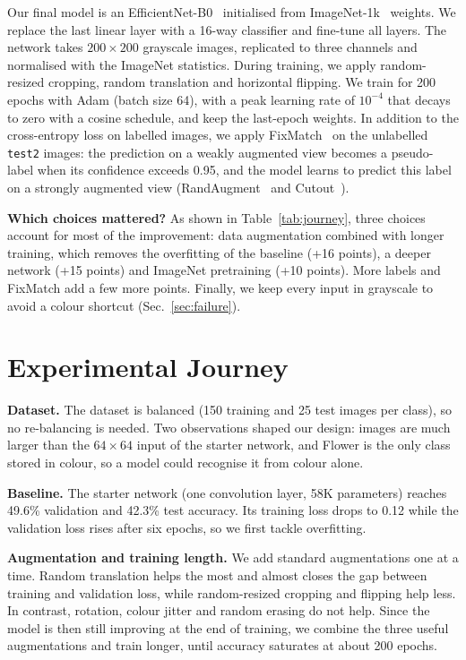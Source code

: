 \documentclass{article}
\begin{document}
Our final model is an EfficientNet-B0~\cite{efficientnet} initialised from ImageNet-1k~\cite{imagenet} weights. We replace the last linear layer with a 16-way classifier and fine-tune all layers. The network takes $200\times200$ grayscale images, replicated to three channels and normalised with the ImageNet statistics. During training, we apply random-resized cropping, random translation and horizontal flipping. We train for 200 epochs with Adam (batch size 64), with a peak learning rate of $10^{-4}$ that decays to zero with a cosine schedule, and keep the last-epoch weights. In addition to the cross-entropy loss on labelled images, we apply FixMatch~\cite{fixmatch} on the unlabelled \texttt{test2} images: the prediction on a weakly augmented view becomes a pseudo-label when its confidence exceeds 0.95, and the model learns to predict this label on a strongly augmented view (RandAugment~\cite{randaugment} and Cutout~\cite{cutout}).

\textbf{Which choices mattered?} As shown in Table~\ref{tab:journey}, three choices account for most of the improvement: data augmentation combined with longer training, which removes the overfitting of the baseline (+16 points), a deeper network (+15 points) and ImageNet pretraining (+10 points). More labels and FixMatch add a few more points. Finally, we keep every input in grayscale to avoid a colour shortcut (Sec.~\ref{sec:failure}).

\section{Experimental Journey}
\label{sec:journey}

\textbf{Dataset.} The dataset is balanced (150 training and 25 test images per class), so no re-balancing is needed. Two observations shaped our design: images are much larger than the $64\times64$ input of the starter network, and Flower is the only class stored in colour, so a model could recognise it from colour alone.

\textbf{Baseline.} The starter network (one convolution layer, 58K parameters) reaches 49.6\% validation and 42.3\% test accuracy. Its training loss drops to 0.12 while the validation loss rises after six epochs, so we first tackle overfitting.

\textbf{Augmentation and training length.} We add standard augmentations one at a time. Random translation helps the most and almost closes the gap between training and validation loss, while random-resized cropping and flipping help less. In contrast, rotation, colour jitter and random erasing do not help. Since the model is then still improving at the end of training, we combine the three useful augmentations and train longer, until accuracy saturates at about 200 epochs.
\end{document}
